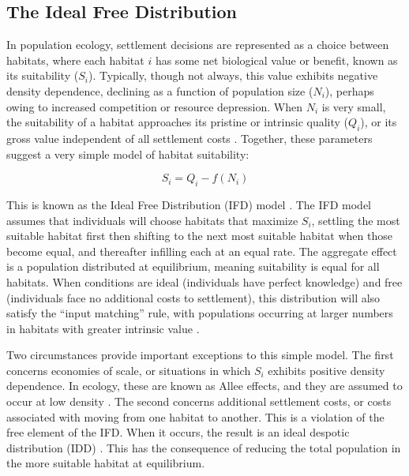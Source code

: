 \documentclass[
  number,
  preprint,
  3p]{elsarticle}
\begin{document}
\hypertarget{the-ideal-free-distribution}{%
\subsection{The Ideal Free
Distribution}\label{the-ideal-free-distribution}}

In population ecology, settlement decisions are represented as a choice
between habitats, where each habitat \(i\) has some net biological value
or benefit, known as its suitability (\(S_i\)). Typically, though not
always, this value exhibits negative density dependence, declining as a
function of population size (\(N_i\)), perhaps owing to increased
competition or resource depression. When \(N_i\) is very small, the
suitability of a habitat approaches its pristine or intrinsic quality
(\(Q_i\)), or its gross value independent of all settlement costs
\citep{greene2001}. Together, these parameters suggest a very simple
model of habitat suitability:

\[
S_i = Q_i - f(N_i)
\]

This is known as the Ideal Free Distribution (IFD) model
\citep{fretwell1969}. The IFD model assumes that individuals will choose
habitats that maximize \(S_i\), settling the most suitable habitat first
then shifting to the next most suitable habitat when those become equal,
and thereafter infilling each at an equal rate. The aggregate effect is
a population distributed at equilibrium, meaning suitability is equal
for all habitats. When conditions are ideal (individuals have perfect
knowledge) and free (individuals face no additional costs to
settlement), this distribution will also satisfy the ``input matching''
rule, with populations occurring at larger numbers in habitats with
greater intrinsic value \citep{parker1978}.

Two circumstances provide important exceptions to this simple model. The
first concerns economies of scale, or situations in which \(S_i\)
exhibits positive density dependence. In ecology, these are known as
Allee effects, and they are assumed to occur at low density
\citep{allee1949, fretwell1969}. The second concerns additional
settlement costs, or costs associated with moving from one habitat to
another. This is a violation of the free element of the IFD. When it
occurs, the result is an ideal despotic distribution (IDD)
\citep{fretwell1969}. This has the consequence of reducing the total
population in the more suitable habitat at equilibrium.
\end{document}
